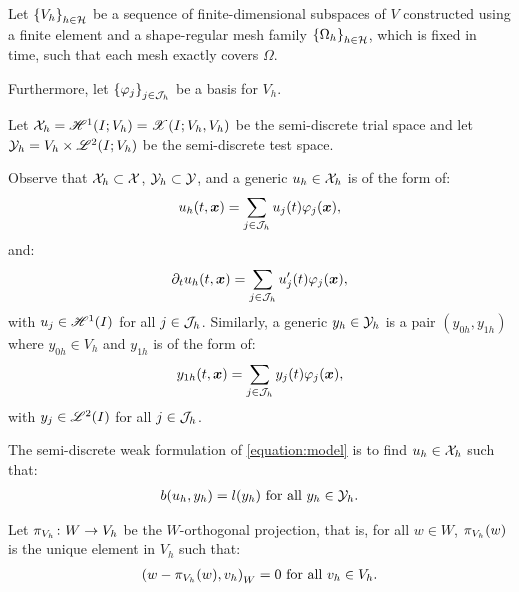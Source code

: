 Let $\left\{ V_h \right\}_{h \in \mathcal{H}}$ be a sequence of finite-dimensional subspaces of $V$ constructed using a finite element and a shape-regular mesh family $\left\{ \Omega_{h} \right\}_{h \in \mathcal{H}}$, which is fixed in time, such that each mesh exactly covers $\Omega$.

Furthermore, let $\left\{ \varphi_j \right\}_{j \in \mathcal{J}_h}$ be a basis for $V_h$.

\begin{definition}
    Let $\mathcal{X}_h = \mathscr{H}^{1}(I; V_h) = \mathscr{X}(I; V_h, V_h)$ be the semi-discrete trial space and let $\mathcal{Y}_h = V_h \times \mathscr{L}^{2}(I; V_h)$ be the semi-discrete test space.
\end{definition}

Observe that $\mathcal{X}_h \subset \mathcal{X}$, $\mathcal{Y}_h \subset \mathcal{Y}$, and a generic $u_h \in \mathcal{X}_h$ is of the form of:
\begin{gather}
    u_h(t, \bm{x}) = \sum_{j \in \mathcal{J}_h} u_j(t) \varphi_j(\bm{x}),
\end{gather}
and:
\begin{gather}
    \partial_t u_h(t, \bm{x}) = \sum_{j \in \mathcal{J}_h} u_j^{\prime}(t) \varphi_j(\bm{x}),
\end{gather}
with $u_j \in \mathscr{H}^{1}(I)$ for all $j \in \mathcal{J}_h$. Similarly, a generic $y_h \in \mathcal{Y}_h$ is a pair $(y_{0h}, y_{1h})$ where $y_{0h} \in V_h$ and $y_{1h}$ is of the form of:
\begin{gather}
    y_{1h}(t, \bm{x}) = \sum_{j \in \mathcal{J}_h} y_j(t) \varphi_j(\bm{x}),
\end{gather}
with $y_j \in \mathscr{L}^{2}(I)$ for all $j \in \mathcal{J}_h$.

\begin{definition}
    The semi-discrete weak formulation of \ref{equation:model} is to find $u_h \in \mathcal{X}_h$ such that:
    \begin{gather} \label{equation:weak_h1}
        b(u_h, y_h) = l(y_h) \text{ for all } y_h \in \mathcal{Y}_h.
    \end{gather}
\end{definition}

\begin{definition}[$\ProjectionOnto{V_h}$]
    Let $\pi_{V_h} \colon W \rightarrow V_h$ be the $W$-orthogonal projection, that is, for all $w \in W$, $\pi_{V_h}(w)$ is the unique element in $V_h$ such that:
    \begin{gather}
        \left( w - \pi_{V_h}(w), v_h \right)_W = 0 \text{ for all } v_h \in V_h.
    \end{gather}
\end{definition}


